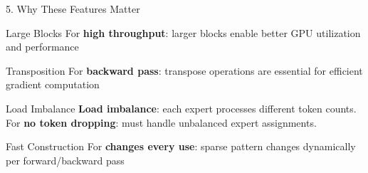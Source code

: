 \documentclass[11pt]{beamer}
\begin{document}
\begin{frame}{5. Why These Features Matter}
    \begin{block}{Large Blocks}
    For \textbf{high throughput}: larger blocks enable better GPU utilization and performance
    \end{block}
    
    \begin{block}{Transposition}
    For \textbf{backward pass}: transpose operations are essential for efficient gradient computation
    \end{block}
    
    \begin{block}{Load Imbalance}
    \textbf{Load imbalance}: each expert processes different token counts. \\
    For \textbf{no token dropping}: must handle unbalanced expert assignments.
    \end{block}
    
    \begin{block}{Fast Construction}
    For \textbf{changes every use}: sparse pattern changes dynamically per forward/backward pass
    \end{block}
\end{frame}
\end{document}
